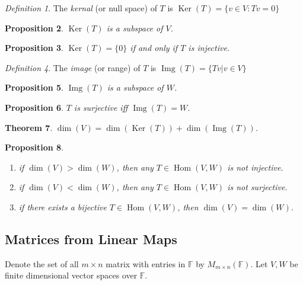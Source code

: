 \documentclass[12pt]{amsart}
\newcommand{\fff}[0]{\mathbb{F}}
\renewcommand{\ker}{\Ker}
\DeclareMathOperator{\Ker}{Ker}
\DeclareMathOperator{\Hom}{Hom}
\DeclareMathOperator{\img}{Img}
\newtheorem{theorem}{Theorem}[section]
\newtheorem{proposition}[theorem]{Proposition}
\theoremstyle{remark}
\newtheorem{definition}[theorem]{Definition}
\numberwithin{equation}{section}
\begin{document}
	\begin{definition}
		The \emph{kernal} (or null space) of $T$ is $\ker(T)=\{v\in V:Tv=0\}$
	\end{definition}
	\begin{proposition}
		$\ker(T)$ is a subspace of $V$.
	\end{proposition}
	\begin{proposition}
		$\ker(T)=\{0\}$ if and only if $T$ is injective. 
	\end{proposition}
	\begin{definition}
		The \emph{image} (or range) of $T$ is $\img(T)=\{Tv|v\in V\}$
	\end{definition}
	\begin{proposition}
		$\img(T)$ is a subspace of $W$.
	\end{proposition}
	\begin{proposition}
		$T$ is surjective iff $\img(T)=W$.
	\end{proposition}
	\begin{theorem}
		$\dim(V)=\dim(\ker(T))+\dim(\img(T))$.
	\end{theorem}
	\begin{proposition}
		\begin{enumerate}
			\item if $\dim(V)>\dim(W)$, then any $T\in\Hom(V,W)$ is not injective.
			\item if $\dim(V)<\dim(W)$, then any $T\in \Hom(V,W)$ is not surjective.
			\item if there exists a bijective $T\in\Hom (V,W)$, then $\dim(V)=\dim(W)$.
		\end{enumerate}
	\end{proposition}
	\subsection{Matrices from Linear Maps}Denote the set of all $m\times n$ matrix with entries in $\fff$ by $M_{m\times n}(\fff)$.
	Let $V,W$ be finite dimensional vector spaces over $\fff$.
	
\end{document}
